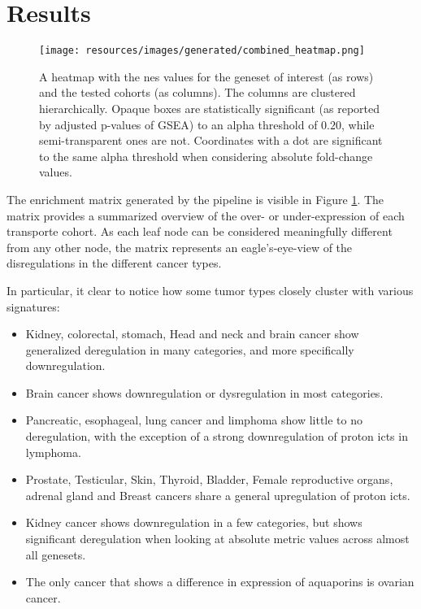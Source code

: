 \section{Results}

\begin{figure}
    \centering
    \texttt{[image: resources/images/generated/combined\_heatmap.png]}
    \caption{\small A heatmap with the \gls{nes} values for the geneset of interest (as rows) and the tested cohorts (as columns). The columns are clustered hierarchically. Opaque boxes are statistically significant (as reported by adjusted p-values of GSEA) to an alpha threshold of $0.20$, while semi-transparent ones are not. Coordinates with a dot are significant to the same alpha threshold when considering absolute fold-change values.}
    \label{fig:full_enrichment_heatmap}
\end{figure}

The enrichment matrix generated by the pipeline is visible in Figure \ref{fig:full_enrichment_heatmap}.
The matrix provides a summarized overview of the over- or under-expression of each transporte cohort.
As each leaf node can be considered meaningfully different from any other node, the matrix represents an eagle's-eye-view of the disregulations in the different cancer types.

In particular, it clear to notice how some tumor types closely cluster with various signatures:
\begin{itemize}
    \item Kidney, colorectal, stomach, Head and neck and brain cancer show generalized deregulation in many categories, and more specifically downregulation.
    \item Brain cancer shows downregulation or dysregulation in most categories.
    \item Pancreatic, esophageal, lung cancer and limphoma show little to no deregulation, with the exception of a strong downregulation of proton \glspl{ict} in lymphoma.
    \item Prostate, Testicular, Skin, Thyroid, Bladder, Female reproductive organs, adrenal gland and Breast cancers share a general upregulation of proton \glspl{ict}.
    \item Kidney cancer shows downregulation in a few categories, but shows significant deregulation when looking at absolute metric values across almost all genesets.
    \item The only cancer that shows a difference in expression of aquaporins is ovarian cancer.
\end{itemize}

